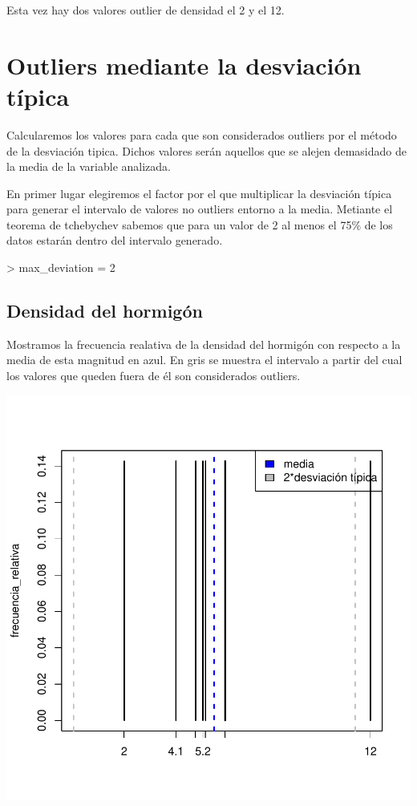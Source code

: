 \documentclass [a4paper] {article}
\begin{document}
Esta vez hay dos valores outlier de densidad el 2 y el 12.


\newpage
\section{Outliers mediante la desviación típica}
Calcularemos los valores para cada que son considerados outliers por el método de la desviación tipica.
Dichos valores serán aquellos que se alejen demasidado de la media de la variable analizada.

En primer lugar elegiremos el factor por el que multiplicar la desviación típica para generar el intervalo de valores no outliers entorno a la media.
Metiante el teorema de tchebychev sabemos que para un valor de 2 al menos el 75\% de los datos estarán dentro del intervalo generado.
\begin{Schunk}
\begin{Sinput}
> max_deviation = 2
\end{Sinput}
\end{Schunk}

\subsection{Densidad del hormigón}
Mostramos la frecuencia realativa de la densidad del hormigón con respecto a la media de esta magnitud en azul.
En gris se muestra el intervalo a partir del cual los valores que queden fuera de él son considerados outliers.
\begin{center}
\begin{Schunk}
\end{Schunk}
\includegraphics{entrega-desviacion_tipica_densidad_plot}
\end{center}
\end{document}
